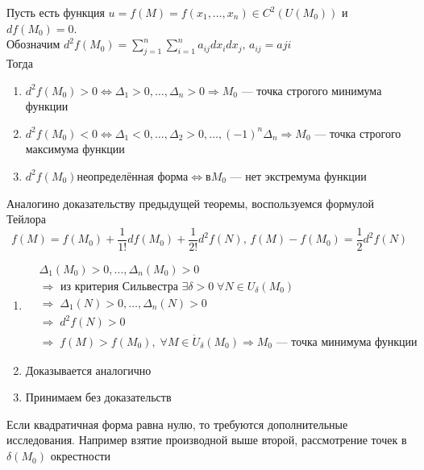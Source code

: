     \begin{Th}
        Пусть есть функция $u = f(M) = f(x_1, \dots, x_n) \in C^2(U(M_0))$ и $df(M_0) = 0$.\\
        Обозначим $d^2f(M_0) = \sum_{j = 1}^{n} \sum_{i = 1}^{n} a_{ij} dx_i dx_j, \, a_{ij} = a{ji}$\\
        Тогда
        \begin{enumerate}
            \item $d^2f(M_0) > 0 \Leftrightarrow \Delta_1 > 0, \dots, \Delta_n > 0 \Rightarrow M_0$ --- точка строгого минимума функции
            \item $d^2f(M_0) < 0 \Leftrightarrow \Delta_1 < 0, \dots, \Delta_2 > 0, \dots, (-1)^n\Delta_n \Rightarrow M_0$ --- точка строгого максимума функции
            \item $d^2f(M_0) \text{неопределённая форма} \Leftrightarrow \text{в} M_0$ --- нет экстремума функции
        \end{enumerate}
    \end{Th}
    \begin{Proof}
        Аналогино доказательству предыдущей теоремы, воспользуемся формулой Тейлора
        \[
            f(M) = f(M_0) + \frac{1}{1!} df(M_0) + \frac{1}{2!} d^2f(N), \, f(M) - f(M_0) = \frac{1}{2} d^2f(N)
        \]
        \begin{enumerate}
            \item \begin{align*}
                &\Delta_1(M_0) > 0, \dots, \Delta_n(M_0) > 0\\
                &\Rightarrow \text{ из критерия Сильвестра } \exists \delta>0 \; \forall N \in U_\delta(M_0)\\
                &\Rightarrow \; \Delta_1(N) > 0, \dots, \Delta_n(N) > 0\\
                &\Rightarrow \; d^2f(N) > 0\\
                &\Rightarrow \; f(M) > f(M_0), \; \forall M \in \mathring{U}_\delta(M_0) \Rightarrow M_0 \text{ --- точка минимума функции}
            \end{align*}
            \item Доказывается аналогично
            \item Принимаем без доказательств
        \end{enumerate}
    \end{Proof}

    \begin{Note}
        Если квадратичная форма равна нулю, то требуются дополнительные исследования. Например взятие производной  выше второй, рассмотрение точек в $\delta(M_0)$ окрестности 
    \end{Note}


